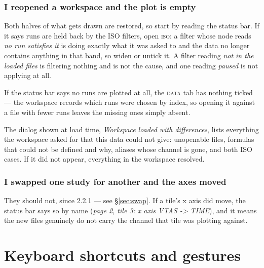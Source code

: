 \documentclass[11pt,a4paper,oneside]{report}
\newcommand{\appver}{2.2.1}
\newcommand{\tab}[1]{\textsc{#1}}
\begin{document}
\subsection{I reopened a workspace and the plot is empty}

Both halves of what gets drawn are restored, so start by reading the status bar.
If it says runs are held back by the ISO filters, open \tab{iso}: a filter whose
node reads \emph{no run satisfies it} is doing exactly what it was asked to and
the data no longer contains anything in that band, so widen or untick it. A
filter reading \emph{not in the loaded files} is filtering nothing and is not
the cause, and one reading \emph{paused} is not applying at all.

If the status bar says no runs are plotted at all, the \tab{data} tab has
nothing ticked --- the workspace records which runs were chosen by index, so
opening it against a file with fewer runs leaves the missing ones simply absent.

The dialog shown at load time, \emph{Workspace loaded with differences}, lists
everything the workspace asked for that this data could not give: unopenable
files, formulas that could not be defined and why, aliases whose channel is
gone, and both ISO cases. If it did not appear, everything in the workspace
resolved.

\subsection{I swapped one study for another and the axes moved}

They should not, since \appver{} --- see \S\ref{sec:swap}. If a tile's x axis
did move, the status bar says so by name (\emph{page 2, tile 3: x axis VTAS ->
TIME}), and it means the new files genuinely do not carry the channel that tile
was plotting against.

\appendix

\chapter{Keyboard shortcuts and gestures}
\end{document}
